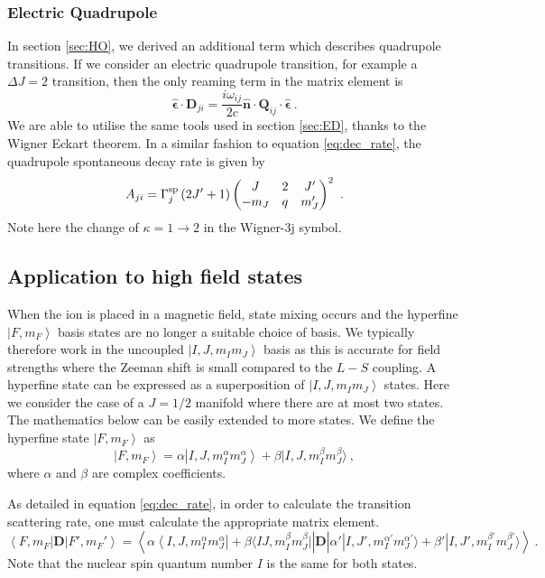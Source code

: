 \documentclass{article}
\begin{document}
\subsubsection{Electric Quadrupole}
In section \ref{sec:HO}, we derived an additional term which describes quadrupole transitions. If we consider an electric quadrupole transition, for example a $\Delta J = 2$ transition, then the only reaming term in the matrix element is
\begin{equation}
    \boldsymbol{\hat{\epsilon}}\cdot\mathbf{D}_{ji} = \frac{i\omega_{ij}}{2c}\boldsymbol{\hat{n}}\cdot\mathbf{Q}_{ij}\cdot \boldsymbol{\hat{\epsilon}}~.
\end{equation}
We are able to utilise the same tools used in section \ref{sec:ED}, thanks to the Wigner Eckart theorem. In a similar fashion to equation \ref{eq:dec_rate}, the quadrupole spontaneous decay rate is given by 
\begin{equation} 
    A_{ji} = \Gamma^{\rm{sp}}_j \left(2J'+1\right)  \begin{pmatrix}
    J & 2 & J'\\
    -m_J & q & m_J'
    \end{pmatrix}^2~.
\end{equation}
Note here the change of $\kappa = 1 \rightarrow 2$ in the Wigner-3j symbol. 

\subsection{Application to high field states}
When the ion is placed in a magnetic field, state mixing occurs and the hyperfine $\left|F, m_F\right\rangle$ basis states are no longer a suitable choice of basis. We typically therefore work in the uncoupled $\left|I, J, m_I m_J\right\rangle$ basis as this is accurate for field strengths where the Zeeman shift is small compared to the $L-S$ coupling. A hyperfine state can be expressed as a superposition of $\left|I, J, m_I m_J\right\rangle$ states. Here we consider the case of a $J=1/2$ manifold where there are at most two states. The mathematics below can be easily extended to more states. We define the hyperfine state $\left|F, m_F\right\rangle$ as
\begin{equation}
    \left|F, m_F\right\rangle = \alpha \left|I, J, m_I^\alpha m_J^\alpha\right\rangle + \beta |I, J, m_I^\beta m_J^\beta\rangle~,
\end{equation}
where $\alpha$ and $\beta$ are complex coefficients. 

As detailed in equation \ref{eq:dec_rate}, in order to calculate the transition scattering rate, one must calculate the appropriate matrix element.  
\begin{equation}
    \left\langle F, m_F\right|\mathbf{D}\left|F', m_F'\right\rangle = \left\langle \alpha \left\langle I, J, m_I^\alpha m_J^\alpha\right| + \beta \langle I J, m_I^\beta m_J^\beta| \right|\mathbf{D}\left|\alpha' |I, J', m_I^{\alpha'} m_J^{\alpha'}\rangle + \beta' |I, J', m_I^{\beta'} m_J^{\beta'}\rangle\right\rangle~. 
\end{equation}
Note that the nuclear spin quantum number $I$ is the same for both states. 
\end{document}
